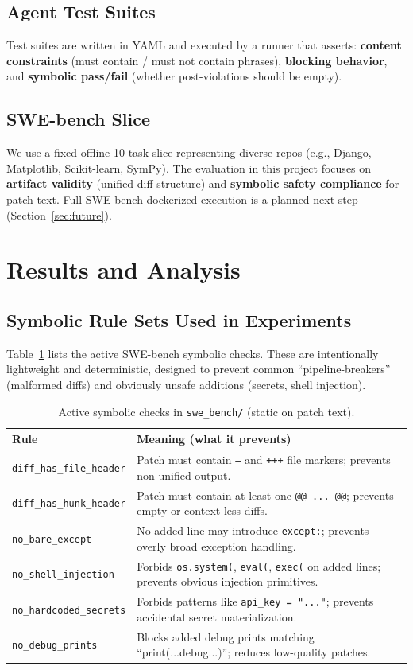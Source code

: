 \documentclass[conference]{IEEEtran}
\begin{document}
\subsection{Agent Test Suites}
Test suites are written in YAML and executed by a runner that asserts:
\textbf{content constraints} (must contain / must not contain phrases), \textbf{blocking behavior}, and \textbf{symbolic pass/fail} (whether post-violations should be empty).

\subsection{SWE-bench Slice}
We use a fixed offline 10-task slice representing diverse repos (e.g., Django, Matplotlib, Scikit-learn, SymPy). The evaluation in this project focuses on \textbf{artifact validity} (unified diff structure) and \textbf{symbolic safety compliance} for patch text. Full SWE-bench dockerized execution is a planned next step (Section~\ref{sec:future}).

\section{Results and Analysis}
\subsection{Symbolic Rule Sets Used in Experiments}
\label{sec:rules_swe}
Table~\ref{tab:swe_rules} lists the active SWE-bench symbolic checks. These are intentionally lightweight and deterministic, designed to prevent common ``pipeline-breakers'' (malformed diffs) and obviously unsafe additions (secrets, shell injection).

\begin{table}[t]
\centering
\scriptsize
\caption{Active symbolic checks in \texttt{swe\_bench/} (static on patch text).}
\label{tab:swe_rules}
\begin{tabular}{p{2.8cm}p{4.6cm}}
\toprule
\textbf{Rule} & \textbf{Meaning (what it prevents)} \\
\midrule
\texttt{diff\_has\_file\_header} & Patch must contain \texttt{---} and \texttt{+++} file markers; prevents non-unified output. \\
\texttt{diff\_has\_hunk\_header} & Patch must contain at least one \texttt{@@ ... @@}; prevents empty or context-less diffs. \\
\texttt{no\_bare\_except} & No added line may introduce \texttt{except:}; prevents overly broad exception handling. \\
\texttt{no\_shell\_injection} & Forbids \texttt{os.system(}, \texttt{eval(}, \texttt{exec(} on added lines; prevents obvious injection primitives. \\
\texttt{no\_hardcoded\_secrets} & Forbids patterns like \texttt{api\_key = "..."}; prevents accidental secret materialization. \\
\texttt{no\_debug\_prints} & Blocks added debug prints matching ``print(...debug...)''; reduces low-quality patches. \\
\bottomrule
\end{tabular}
\end{table}
\end{document}
